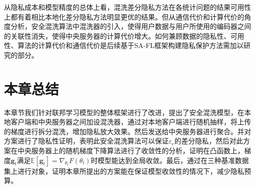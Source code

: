 从隐私成本和模型精度的总体上看，混洗差分隐私方法在各统计问题的结果可用性上都有着相比本地化差分隐私方法明显更优的结果。但从通信代价和计算代价的角度分析，安全混洗算法中混洗器的引入，使得用户数据与用户所使用的编码器之间的关联性消失，使得中央服务器的计算代价增大。如何兼顾数据的隐私性、可用性、算法的计算代价和通信代价是后续基于SA-FL框架构建隐私保护方法需加以研究的部分。


\section{本章总结}
本章节我们针对联邦学习模型的整体框架进行了改进，提出了安全混洗模型，在本地客户端和中央服务器之间加设混洗器，通过对本地客户端进行随机抽样，将上传的梯度进行拆分混洗，增加隐私放大效果。然后发送给中央服务器进行聚合。并对方案进行了隐私性证明，表明此安全混洗算法可以保证$\varepsilon_{\mathrm{c}}$的差分隐私，然后对此方案在中央服务器上的随机梯度下降算法进行了收敛性的分析，证明在凸函数上，梯度$\mathbf{g}_{t}$满足$\mathbb{E}\left[\mathbf{g}_{t}\right]=\nabla_{\theta_{t}} F\left(\theta_{t}\right)$时模型能达到全局收敛。最后，通过在三种基准数据集上进行对象，证明本章所提出的方案能在保证模型收敛性的情况下，减少隐私预算。


